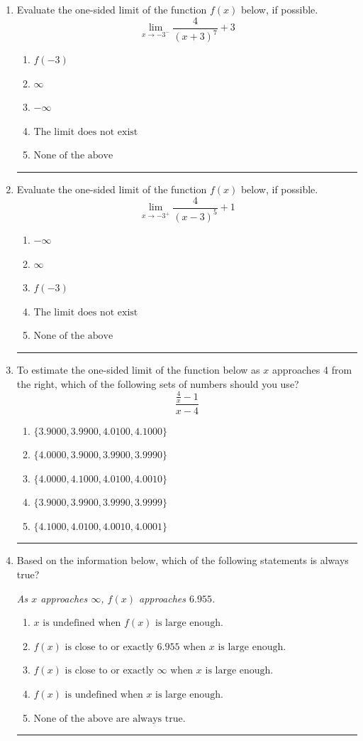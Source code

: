 \documentclass[14pt]{extbook}
\newcommand{\litem}[1]{\item#1\hspace*{-1cm}\rule{\textwidth}{0.4pt}}
\begin{document}
\begin{enumerate}
{\begin{enumerate}[label=\Alph*.]
\end{enumerate} }
\litem{
Evaluate the one-sided limit of the function $f(x)$ below, if possible.\[ \lim_{x \rightarrow -3^-} \frac{4}{(x+3)^7}+3 \]\begin{enumerate}[label=\Alph*.]
\item \( f(-3) \)
\item \( \infty \)
\item \( -\infty \)
\item \( \text{The limit does not exist} \)
\item \( \text{None of the above} \)

\end{enumerate} }
\litem{
Evaluate the one-sided limit of the function $f(x)$ below, if possible.\[ \lim_{x \rightarrow -3^+} \frac{4}{(x-3)^5}+1 \]\begin{enumerate}[label=\Alph*.]
\item \( -\infty \)
\item \( \infty \)
\item \( f(-3) \)
\item \( \text{The limit does not exist} \)
\item \( \text{None of the above} \)

\end{enumerate} }
\litem{
To estimate the one-sided limit of the function below as $x$ approaches 4 from the right, which of the following sets of numbers should you use?\[ \frac{\frac{4}{x} - 1}{x - 4} \]\begin{enumerate}[label=\Alph*.]
\item \( \{ 3.9000, 3.9900, 4.0100, 4.1000 \} \)
\item \( \{ 4.0000, 3.9000, 3.9900, 3.9990 \} \)
\item \( \{ 4.0000, 4.1000, 4.0100, 4.0010 \} \)
\item \( \{ 3.9000, 3.9900, 3.9990, 3.9999 \} \)
\item \( \{ 4.1000, 4.0100, 4.0010, 4.0001 \} \)

\end{enumerate} }
\litem{
Based on the information below, which of the following statements is always true?
\begin{center}
    \textit{ As $x$ approaches $\infty$, $f(x)$ approaches $6.955$. }
\end{center}
\begin{enumerate}[label=\Alph*.]
\item \( x \text{ is undefined when } f(x) \text{ is large enough}. \)
\item \( f(x) \text{ is close to or exactly } 6.955 \text{ when } x \text{ is large enough}. \)
\item \( f(x) \text{ is close to or exactly } \infty \text{ when } x \text{ is large enough}. \)
\item \( f(x) \text{ is undefined when } x \text{ is large enough}. \)
\item \( \text{None of the above are always true.} \)


\end{enumerate}}
\end{enumerate}
\end{document}
